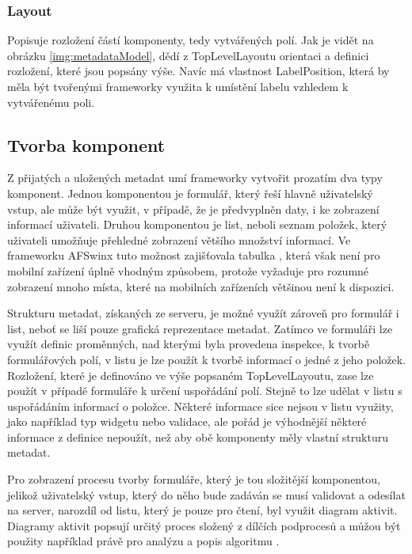 \subsubsection{Layout}
Popisuje rozložení částí komponenty, tedy vytvářených polí. Jak je vidět na obrázku \ref{img:metadataModel}, dědí z TopLevelLayoutu orientaci a definici rozložení, které jsou popsány výše. Navíc má vlastnost LabelPosition, která by měla být tvořenými frameworky využita k umístění labelu vzhledem k vytvářenému poli.

\subsection{Tvorba komponent}
Z přijatých a uložených metadat umí frameworky vytvořit prozatím dva typy komponent. Jednou komponentou je formulář, který řeší hlavně uživatelský vstup, ale může být využit, v případě, že je předvyplněn daty, i ke zobrazení informací uživateli. Druhou komponentou je list, neboli seznam položek, který uživateli umožňuje přehledné zobrazení většího množství informací. Ve frameworku AFSwinx tuto možnost zajišťovala tabulka \cite{tomasek-thesis}, která však není pro mobilní zařízení úplně vhodným způsobem, protože vyžaduje pro rozumné zobrazení mnoho místa, které na mobilních zařízeních většinou není k dispozici.

Strukturu metadat, získaných ze serveru, je možné využít zároveň pro formulář i list, neboť se liší pouze grafická reprezentace metadat. Zatímco ve formuláři lze využít definic proměnných, nad kterými byla provedena inspekce, k tvorbě formulářových polí, v listu je lze použít k tvorbě informací o jedné z jeho položek. Rozložení, které je definováno ve výše popsaném TopLevelLayoutu, zase lze použít v případě formuláře k určení uspořádání polí. Stejně to lze udělat v listu s uspořádáním informací o položce. Některé informace sice nejsou v listu využity, jako například typ widgetu nebo validace, ale pořád je výhodnější některé informace z definice nepoužít, než aby obě komponenty měly vlastní strukturu metadat. 

Pro zobrazení procesu tvorby formuláře, který je tou složitější komponentou, jelikož uživatelský vstup, který do něho bude zadáván se musí validovat a odesílat na server, narozdíl od listu, který je pouze pro čtení, byl využit diagram aktivit. Diagramy aktivit popsují určitý proces složený z dílčích podprocesů a můžou být použity například právě pro analýzu a popis algoritmu \cite{UmlArlow}. 

